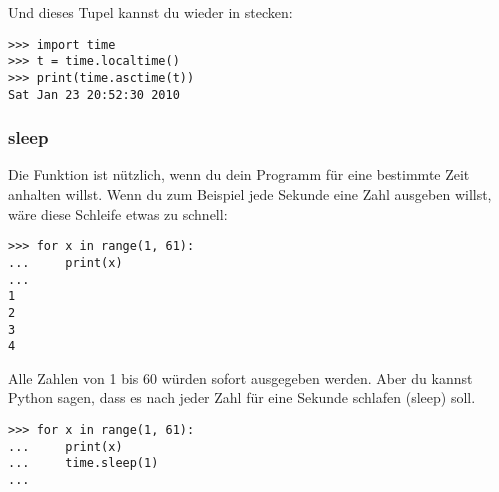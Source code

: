 \noindent
Und dieses Tupel kannst du wieder in  stecken:

\begin{Verbatim}[frame=single]
>>> import time
>>> t = time.localtime()
>>> print(time.asctime(t))
Sat Jan 23 20:52:30 2010
\end{Verbatim}

\noindent
\subsubsection*{sleep}
Die Funktion  ist nützlich, wenn du dein Programm für eine bestimmte Zeit anhalten willst. Wenn du zum Beispiel jede Sekunde eine Zahl ausgeben willst, wäre diese Schleife etwas zu schnell:

\begin{Verbatim}[frame=single]
>>> for x in range(1, 61):
...     print(x)
...
1
2
3
4
\end{Verbatim}

Alle Zahlen von 1 bis 60 würden sofort ausgegeben werden. Aber du kannst Python sagen, dass es nach jeder Zahl für eine Sekunde schlafen (sleep) soll.

\begin{Verbatim}[frame=single]
>>> for x in range(1, 61):
...     print(x)
...     time.sleep(1)
...
\end{Verbatim}

